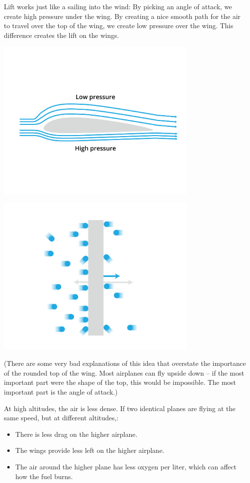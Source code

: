 Lift works just like a sailing into the wind: By picking an angle of attack,   we create high pressure under the wing.  By creating a nice smooth path for the 
air to travel over the top of the wing,  we create low pressure over the wing.  This difference creates the lift on the wings.

\includegraphics[width=0.75\textwidth]{airfoil.png}

\includegraphics[width=0.75\textwidth]{pressureMicro.png}

(There are some very bad explanations of this idea that overstate the importance of the rounded top of the wing.   Most airplanes can fly upside down -- if the 
most important part were the shape of the top,  this would be impossible.  The most important part is the angle of attack.)

At high altitudes,  the air is less dense.  If two identical planes are flying  at the same speed,  but at different altitudes,: 
\begin{itemize}
\item There is less drag on the higher airplane.
\item The wings provide less left on the higher airplane.
\item The air around the higher plane has less oxygen per liter,  which can affect how the fuel burns.
\end{itemize}

